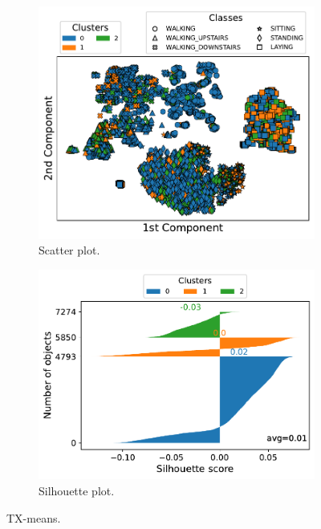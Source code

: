 \documentclass[10pt, a4paper, twocolumn]{article}
\begin{document}
\begin{figure}
\centering
\begin{subfigure}[t]{0.49\columnwidth}
    \includegraphics[width=\linewidth]{immagini simone/txmeans_scatter.pdf}
    \caption{Scatter plot.}
    \label{fig:txmeans_scatter}
\end{subfigure}
\begin{subfigure}[t]{0.50\columnwidth}
    \includegraphics[width=\linewidth]{immagini simone/txmeans_silh.pdf}
    \caption{Silhouette plot.}
    \label{fig:txmeans_silh}
\end{subfigure}
\caption{TX-means.}
\label{fig:txmeans}
\end{figure}
\end{document}
